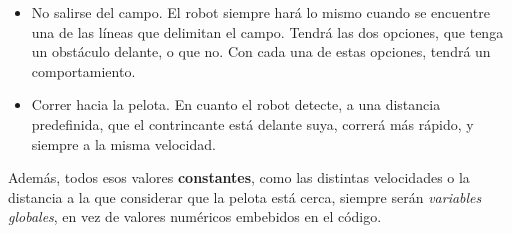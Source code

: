 \begin{description}
	\begin{itemize}
		\item No salirse del campo. El robot siempre hará lo mismo cuando se encuentre una de las líneas que delimitan el campo. Tendrá las dos opciones, que tenga un obstáculo delante, o que no. Con cada una de estas opciones, tendrá un comportamiento.
		\item Correr hacia la pelota. En cuanto el robot detecte, a una distancia predefinida, que el contrincante está delante suya, correrá más rápido, y siempre a la misma velocidad. 		
	\end{itemize} 
	Además, todos esos valores \textbf{constantes}, como las distintas velocidades o la distancia a la que considerar que la pelota está cerca, siempre serán \textit{variables globales}, en vez de valores numéricos embebidos en el código.
	

\end{description}
